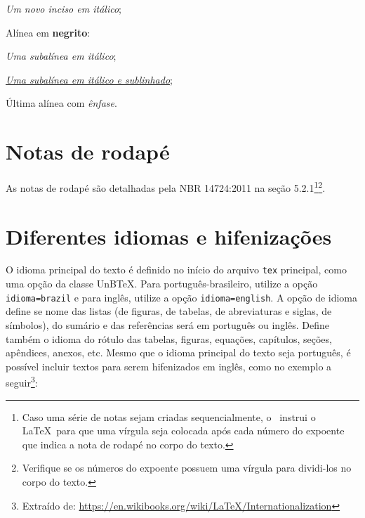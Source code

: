 \begin{alineas}
  \begin{incisos}
    \item \textit{Um novo inciso em itálico};
  \end{incisos}
  
  \item Alínea em \textbf{negrito}:
  
  \begin{subalineas}
    \item \textit{Uma subalínea em itálico};
    \item \underline{\textit{Uma subalínea em itálico e sublinhado}}; 
  \end{subalineas}
  
  \item Última alínea com \emph{ênfase}.
  
\end{alineas}

\section{Notas de rodapé}

As notas de rodapé são detalhadas pela NBR 14724:2011 na seção 5.2.1\footnote{Caso uma série de notas sejam criadas sequencialmente, o \abnTeX\ instrui o \LaTeX\ para que uma vírgula seja colocada após cada número do expoente que indica a nota de rodapé no corpo do texto.}\footnote{Verifique se os números do expoente possuem uma vírgula para dividi-los no corpo do texto.}.

\section{Diferentes idiomas e hifenizações}
\label{sec:hifenizacao}

O idioma principal do texto é definido no início do arquivo \texttt{tex} principal, como uma opção da classe UnB\TeX. Para português-brasileiro, utilize a opção \texttt{idioma=brazil} e para inglês, utilize a opção \texttt{idioma=english}. A opção de idioma define se nome das listas (de figuras, de tabelas, de abreviaturas e siglas, de símbolos), do sumário e das referências será em português ou inglês. Define também o idioma do rótulo das tabelas, figuras, equações, capítulos, seções, apêndices, anexos, etc. Mesmo que o idioma principal do texto seja português, é possível incluir textos para serem hifenizados em inglês, como no exemplo a seguir\footnote{Extraído de: \url{https://en.wikibooks.org/wiki/LaTeX/Internationalization}}:

